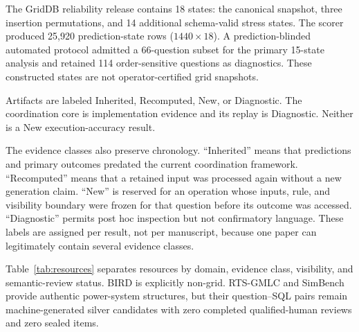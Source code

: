 \documentclass[applsci,article,submit,moreauthors]{Definitions/mdpi}
\begin{document}
The GridDB reliability release contains 18 states: the canonical snapshot, three insertion permutations, and 14 additional schema-valid stress states. The scorer produced 25,920 prediction-state rows ($1440\times18$). A prediction-blinded automated protocol admitted a 66-question subset for the primary 15-state analysis and retained 114 order-sensitive questions as diagnostics. These constructed states are not operator-certified grid snapshots.

Artifacts are labeled Inherited, Recomputed, New, or Diagnostic. The coordination core is implementation evidence and its replay is Diagnostic. Neither is a New execution-accuracy result.

The evidence classes also preserve chronology. ``Inherited'' means that predictions and primary outcomes predated the current coordination framework. ``Recomputed'' means that a retained input was processed again without a new generation claim. ``New'' is reserved for an operation whose inputs, rule, and visibility boundary were frozen for that question before its outcome was accessed. ``Diagnostic'' permits post hoc inspection but not confirmatory language. These labels are assigned per result, not per manuscript, because one paper can legitimately contain several evidence classes.

Table~\ref{tab:resources} separates resources by domain, evidence class, visibility, and semantic-review status. BIRD is explicitly non-grid. RTS-GMLC and SimBench provide authentic power-system structures, but their question--SQL pairs remain machine-generated silver candidates with zero completed qualified-human reviews and zero sealed items.
\end{document}
